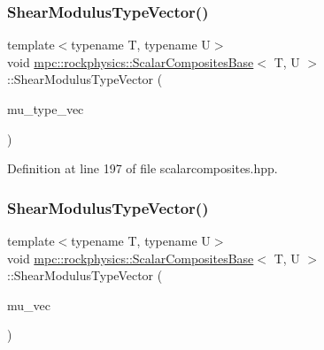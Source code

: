 \subsubsection{\texorpdfstring{Shear\+Modulus\+Type\+Vector()}{ShearModulusTypeVector()}\hspace{0.1cm}{\footnotesize\ttfamily [2/3]}}
{\footnotesize\ttfamily template$<$typename T, typename U$>$ \\
void \mbox{\hyperlink{classmpc_1_1rockphysics_1_1_scalar_composites_base}{mpc\+::rockphysics\+::\+Scalar\+Composites\+Base}}$<$ T, U $>$\+::Shear\+Modulus\+Type\+Vector (\begin{DoxyParamCaption}\item[{std\+::vector$<$ \mbox{\hyperlink{structmpc_1_1rockphysics_1_1_shear_modulus_type}{mpc\+::rockphysics\+::\+Shear\+Modulus\+Type}}$<$ T $>$ $>$}]{mu\+\_\+type\+\_\+vec }\end{DoxyParamCaption})\hspace{0.3cm}{\ttfamily [inline]}}



Definition at line 197 of file scalarcomposites.\+hpp.

\mbox{\label{classmpc_1_1rockphysics_1_1_scalar_composites_base_ab2bb8171013549edf67c6e8d98a23fb6}} 
\subsubsection{\texorpdfstring{Shear\+Modulus\+Type\+Vector()}{ShearModulusTypeVector()}\hspace{0.1cm}{\footnotesize\ttfamily [3/3]}}
{\footnotesize\ttfamily template$<$typename T, typename U$>$ \\
void \mbox{\hyperlink{classmpc_1_1rockphysics_1_1_scalar_composites_base}{mpc\+::rockphysics\+::\+Scalar\+Composites\+Base}}$<$ T, U $>$\+::Shear\+Modulus\+Type\+Vector (\begin{DoxyParamCaption}\item[{std\+::vector$<$ T $>$ \&}]{mu\+\_\+vec }\end{DoxyParamCaption})\hspace{0.3cm}{\ttfamily [inline]}}




